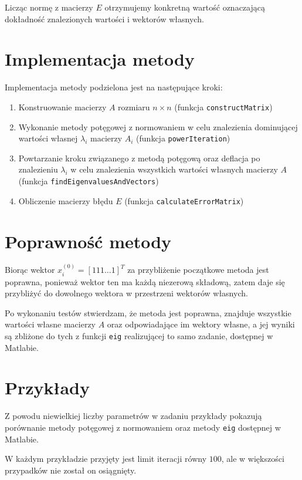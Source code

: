 \documentclass[12pt]{article}
\begin{document}
	Licząc normę z macierzy $E$ otrzymujemy konkretną wartość oznaczającą dokładność znalezionych wartości i wektorów własnych.
	
	\section{Implementacja metody}
	Implementacja metody podzielona jest na następujące kroki:
	\begin{enumerate}
		\item Konstruowanie macierzy $A$ rozmiaru $n \times n$ (funkcja \texttt{constructMatrix})
		\item Wykonanie metody potęgowej z normowaniem w celu znalezienia dominującej wartości własnej $\lambda_i$ macierzy $A_i$ (funkcja \texttt{powerIteration})
		\item Powtarzanie kroku związanego z metodą potęgową oraz deflacja po znalezieniu $\lambda_i$ w celu znalezienia wszystkich wartości własnych macierzy $A$ (funkcja \texttt{findEigenvaluesAndVectors})
		\item Obliczenie macierzy błędu $E$ (funkcja \texttt{calculateErrorMatrix})
	\end{enumerate}

	
	
	\section{Poprawność metody}
	Biorąc wektor $x_i^{(0)} = [1 1 1 \dots 1]^T$ za przybliżenie początkowe metoda jest poprawna, ponieważ wektor ten ma każdą niezerową składową, zatem daje się przybliżyć do dowolnego wektora w przestrzeni wektorów własnych.
	
	Po wykonaniu testów stwierdzam, że metoda jest poprawna, znajduje wszystkie wartości własne macierzy $A$ oraz odpowiadające im wektory własne, a jej wyniki są zbliżone do tych z funkcji \texttt{eig} realizującej to samo zadanie, dostępnej w Matlabie.
	
	
	
	\section{Przykłady}
	Z powodu niewielkiej liczby parametrów w zadaniu przykłady pokazują porównanie metody potęgowej z normowaniem oraz metody \texttt{eig} dostępnej w Matlabie.
	
	W każdym przykładzie przyjęty jest limit iteracji równy $100$, ale w większości przypadków nie został on osiągnięty.
	
\end{document}
